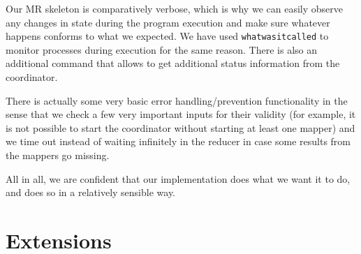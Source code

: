 \documentclass[a4paper]{article}
\begin{document}
Our MR skeleton is comparatively verbose, which is why we can easily observe any changes in state during the program execution and make sure whatever happens conforms to what we expected. We have used \texttt{whatwasitcalled} to monitor processes during execution for the same reason. There is also an additional command that allows to get additional status information from the coordinator.

There is actually some very basic error handling/prevention functionality in the sense that we check a few very important inputs for their validity (for example, it is not possible to start the coordinator without starting at least one mapper) and we time out instead of waiting infinitely in the reducer in case some results from the mappers go missing.

All in all, we are confident that our implementation does what we want it to do, and does so in a relatively sensible way.

\section*{Extensions}
\end{document}
